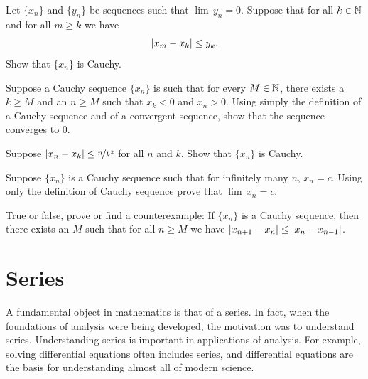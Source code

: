 \begin{exercise}
Let $\{ x_n \}$ and $\{ y_n \}$ be sequences such
that $\lim\, y_n =0$.  Suppose that for all $k \in {\mathbb{N}}$
and
for all $m \geq k$ we have
\begin{equation*}
\left\lvert {x_m-x_k} \right\rvert \leq y_k .
\end{equation*}
Show that $\{ x_n \}$ is Cauchy.
\end{exercise}

\begin{exercise}
Suppose a Cauchy sequence $\{ x_n \}$ is such that for every $M \in {\mathbb{N}}$,
there exists a $k \geq M$ and an $n \geq M$ such that
$x_k < 0$ and $x_n > 0$.  Using simply the definition of a Cauchy sequence
and of a convergent sequence, show that
the sequence converges to $0$.
\end{exercise}

\begin{exercise}
Suppose $\left\lvert {x_n-x_k} \right\rvert \leq \nicefrac{n}{k^2}$ for all $n$ and $k$.
Show that $\{ x_n \}$ is Cauchy.
\end{exercise}

\begin{exercise}
Suppose $\{ x_n \}$ is a Cauchy sequence such that for infinitely many
$n$, $x_n = c$.  Using only the definition of Cauchy sequence prove 
that $\lim\, x_n = c$.
\end{exercise}

\begin{exercise}
True or false, prove or find a counterexample:  If $\{ x_n \}$ is a Cauchy
sequence, then there exists an $M$
such that for all $n \geq M$ we have
$\left\lvert {x_{n+1}-x_n} \right\rvert
\leq
\left\lvert {x_{n}-x_{n-1}} \right\rvert$.
\end{exercise}



\sectionnewpage
\section{Series}
\label{sec:series}


A fundamental object in mathematics is that of a series.  In fact, when
the foundations of analysis were being developed, the motivation was to
understand series.  Understanding series is important in applications
of analysis.  For example, solving differential equations often includes
series, and differential equations are the basis for understanding
almost all of modern science.

